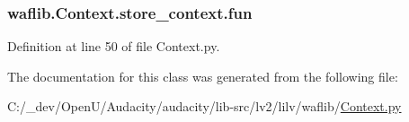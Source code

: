 \subsubsection[{\texorpdfstring{fun}{fun}}]{\setlength{\rightskip}{0pt plus 5cm}waflib.\+Context.\+store\+\_\+context.\+fun}\hypertarget{classwaflib_1_1_context_1_1store__context_a43ceaa15d010c5c96880b88acf60e05b}{}\label{classwaflib_1_1_context_1_1store__context_a43ceaa15d010c5c96880b88acf60e05b}


Definition at line 50 of file Context.\+py.



The documentation for this class was generated from the following file\+:\begin{DoxyCompactItemize}
\item 
C\+:/\+\_\+dev/\+Open\+U/\+Audacity/audacity/lib-\/src/lv2/lilv/waflib/\hyperlink{lilv_2waflib_2_context_8py}{Context.\+py}\end{DoxyCompactItemize}
